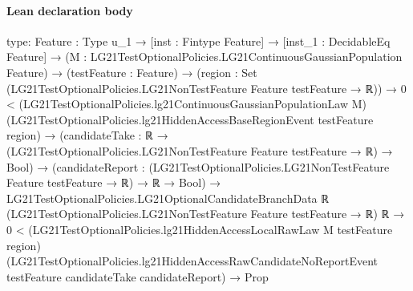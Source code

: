 \documentclass[10pt]{article}
\begin{document}
\paragraph{Lean declaration body}
\begin{ReviewVerbatim}
type:
{Feature : Type u_1} →
  [inst : Fintype Feature] →
    [inst_1 : DecidableEq Feature] →
      (M : LG21TestOptionalPolicies.LG21ContinuousGaussianPopulation Feature) →
        (testFeature : Feature) →
          (region : Set (LG21TestOptionalPolicies.LG21NonTestFeature Feature testFeature → ℝ)) →
            0 <
                (LG21TestOptionalPolicies.lg21ContinuousGaussianPopulationLaw M)
                  (LG21TestOptionalPolicies.lg21HiddenAccessBaseRegionEvent testFeature region) →
              (candidateTake : ℝ → (LG21TestOptionalPolicies.LG21NonTestFeature Feature testFeature → ℝ) → Bool) →
                (candidateReport : (LG21TestOptionalPolicies.LG21NonTestFeature Feature testFeature → ℝ) → ℝ → Bool) →
                  LG21TestOptionalPolicies.LG21OptionalCandidateBranchData ℝ
                      (LG21TestOptionalPolicies.LG21NonTestFeature Feature testFeature → ℝ) ℝ →
                    0 <
                        (LG21TestOptionalPolicies.lg21HiddenAccessLocalRawLaw M testFeature region)
                          (LG21TestOptionalPolicies.lg21HiddenAccessRawCandidateNoReportEvent testFeature candidateTake
                            candidateReport) →
                      Prop


\end{ReviewVerbatim}
\end{document}
